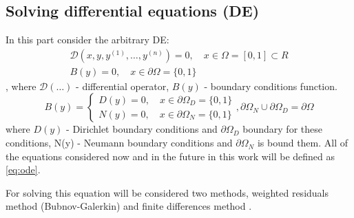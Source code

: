 \subsection{Solving differential equations (DE)}
In this part consider the arbitrary DE:
\begin{equation}
	\label{eq:ode}
	\begin{multlined}
		\mathcal{D}\left (x, y, y^{(1)}, \dots, y^{(n)}\right) = 0, \quad x \in \Omega = [0, 1] \subset  R \\
		B(y) = 0, \quad x \in \partial \Omega = \{0, 1\}
	\end{multlined}
\end{equation}
, where $\mathcal{D}(\dots)$ - differential operator, $B(y)$ - boundary conditions function. 
\begin{equation*}
	B(y) = \begin{cases}
		D(y) = 0, \quad x \in \partial \Omega_D = \{0, 1\} \\
		N(y) = 0, \quad x \in \partial \Omega_N = \{0, 1\} 
	\end{cases}, \partial \Omega_N \cup \partial \Omega_D = \partial \Omega
\end{equation*}
where $D(y)$ - Dirichlet boundary conditions and $\partial \Omega_D$ boundary for these conditions, N(y) - Neumann boundary conditions and $\partial \Omega_N$ is bound them.
All of the equations considered now and in the future in this work will be defined as \eqref{eq:ode}.

For solving this equation will be considered two methods, weighted residuals method \cite{fletcher2012computational} (Bubnov-Galerkin) and finite differences method \cite{dimov2019finite}.

